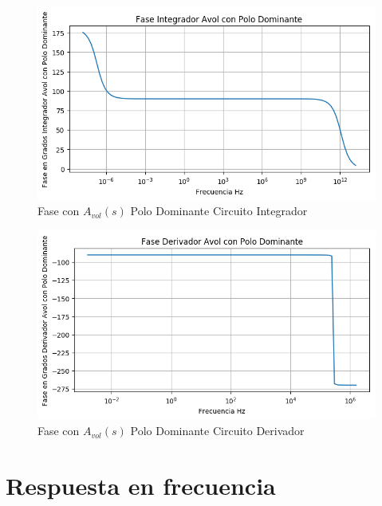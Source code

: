 \begin{figure}[H]
	\centering
	\includegraphics[width=\textwidth]{Ejercicio4/BODE-AVOLW-FASE-INTEGRADO}
	\caption{Fase con $A_{vol}(s)$ Polo Dominante Circuito Integrador}
\end{figure}


\begin{figure}[H]
	\centering
	\includegraphics[width=\textwidth]{Ejercicio4/BODE-AVOLW-FASE-DERIVADOR}
	\caption{Fase con $A_{vol}(s)$ Polo Dominante Circuito Derivador}
\end{figure}

\section{Respuesta en frecuencia}
